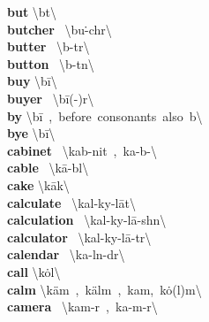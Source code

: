 \documentclass[10pt,a4paper]{article}
\begin{document}
\begin{multicols}{2}
\textbf{ but }\quad \textbackslash \textprimstress b\textschwa t\textbackslash \\
\textbf{ butcher }\quad \ \textbackslash \textprimstress bu\. -ch\textschwa r\textbackslash \\
\textbf{ butter }\quad \ \textbackslash \textprimstress b\textschwa -t\textschwa r\textbackslash \\
\textbf{ button }\quad \ \textbackslash \textprimstress b\textschwa -t\textsuperscript{\textreve}n\textbackslash \\
\textbf{ buy }\quad \textbackslash \textprimstress b\={i}\textbackslash \\
\textbf{ buyer }\quad \ \textbackslash \textprimstress b\={i}(-\textschwa )r\textbackslash \\
\textbf{ by }\quad \textbackslash \textprimstress b\={i}\ ,\ before\ consonants\ also\ b\textschwa \textbackslash \\
\textbf{ bye }\quad \textbackslash \textprimstress b\={i}\textbackslash \\
\textbf{ cabinet }\quad \ \textbackslash \textprimstress kab-nit\ ,\ \textprimstress ka-b\textschwa -\textbackslash \\
\textbf{ cable }\quad \ \textbackslash \textprimstress k\={a}-b\textschwa l\textbackslash \\
\textbf{ cake }\quad \textbackslash \textprimstress k\={a}k\textbackslash \\
\textbf{ calculate }\quad \ \textbackslash \textprimstress kal-ky\textschwa -\textsecstress l\={a}t\textbackslash \\
\textbf{ calculation }\quad \ \textbackslash \textsecstress kal-ky\textschwa -\textprimstress l\={a}-sh\textschwa n\textbackslash \\
\textbf{ calculator }\quad \ \textbackslash \textprimstress kal-ky\textschwa -\textsecstress l\={a}-t\textschwa r\textbackslash \\
\textbf{ calendar }\quad \ \textbackslash \textprimstress ka-l\textschwa n-d\textschwa r\textbackslash \\
\textbf{ call }\quad \textbackslash \textprimstress k\.{o}l\textbackslash \\
\textbf{ calm }\quad \textbackslash \textprimstress k\"{a}m\ ,\ \textprimstress k\"{a}lm\ ,\ \textprimstress kam,\ \textprimstress k\.{o}(l)m\textbackslash \\
\textbf{ camera }\quad \ \textbackslash \textprimstress kam-r\textschwa \ ,\ \textprimstress ka-m\textschwa -r\textschwa \textbackslash \\

\end{multicols}
\end{document}
